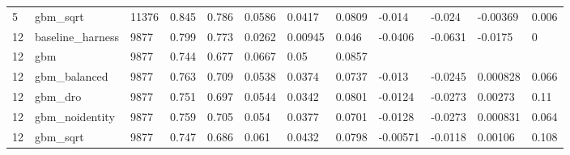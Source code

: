 \begin{tabular}{llllllllllll}
5 & gbm\_sqrt & 11376 & 0.845 & 0.786 & 0.0586 & 0.0417 & 0.0809 & -0.014 & -0.024 & -0.00369 & 0.006 \\
12 & baseline\_harness & 9877 & 0.799 & 0.773 & 0.0262 & 0.00945 & 0.046 & -0.0406 & -0.0631 & -0.0175 & 0 \\
12 & gbm & 9877 & 0.744 & 0.677 & 0.0667 & 0.05 & 0.0857 &  &  &  &  \\
12 & gbm\_balanced & 9877 & 0.763 & 0.709 & 0.0538 & 0.0374 & 0.0737 & -0.013 & -0.0245 & 0.000828 & 0.066 \\
12 & gbm\_dro & 9877 & 0.751 & 0.697 & 0.0544 & 0.0342 & 0.0801 & -0.0124 & -0.0273 & 0.00273 & 0.11 \\
12 & gbm\_noidentity & 9877 & 0.759 & 0.705 & 0.054 & 0.0377 & 0.0701 & -0.0128 & -0.0273 & 0.000831 & 0.064 \\
12 & gbm\_sqrt & 9877 & 0.747 & 0.686 & 0.061 & 0.0432 & 0.0798 & -0.00571 & -0.0118 & 0.00106 & 0.108 \\
\bottomrule
\end{tabular}